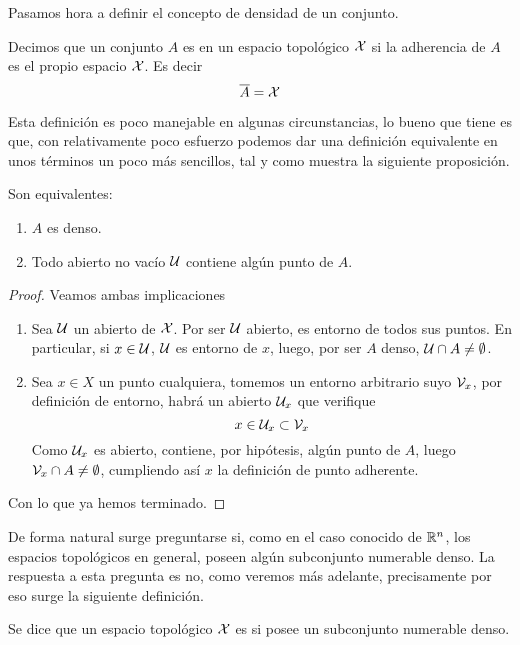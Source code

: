 Pasamos hora a definir el concepto de densidad de un conjunto.
\begin{defi}
	\label{etop_def_denso}
	Decimos que un conjunto $A$ es  en un espacio topológico $\mathcal{X}$ si la adherencia de $A$ es el propio espacio $\mathcal{X}$. Es decir
	\begin{equation*}
	\overline{A}=\mathcal{X}
	\end{equation*}
\end{defi}
Esta definición es poco manejable en algunas circunstancias, lo bueno que tiene es que, con relativamente poco esfuerzo podemos dar una definición equivalente en unos términos un poco más sencillos, tal y como muestra la siguiente proposición.
\begin{prop}
	Son equivalentes:
	\begin{enumerate}
		\item $A$ es denso.
		\item Todo abierto no vacío $\mathcal{U}$ contiene algún punto de $A$.
	\end{enumerate}
\end{prop}
\begin{proof} Veamos ambas implicaciones
	\begin{enumerate}
		\item[\bra] Sea $\mathcal{U}$ un abierto de $\mathcal{X}$. Por ser $\mathcal{U}$ abierto, es entorno de todos sus puntos. En particular, si $x\in\mathcal{U}$, $\mathcal{U}$ es entorno de $x$, luego, por ser $A$ denso, $\mathcal{U}\cap A\not= \emptyset$.
		\item[\bla] Sea $x\in X$ un punto cualquiera, tomemos un entorno arbitrario suyo $\mathcal{V}_x$, por definición de entorno, habrá un abierto $\mathcal{U}_x$ que verifique
		\begin{equation*}
		x\in\mathcal{U}_x\subset\mathcal{V}_x
		\end{equation*}
		Como $\mathcal{U}_x$ es abierto, contiene, por hipótesis, algún punto de $A$, luego $\mathcal{V}_x\cap A\not=\emptyset$, cumpliendo así $x$ la definición de punto adherente.
	\end{enumerate}
	Con lo que ya hemos terminado.
\end{proof}
De forma natural surge preguntarse si, como en el caso conocido de $\mathbb{R}^n$, los espacios topológicos en general, poseen algún subconjunto numerable denso. La respuesta a esta pregunta es no, como veremos más adelante, precisamente por eso surge la siguiente definición.
\begin{defi}
	Se dice que un espacio topológico $\mathcal{X}$ es  si posee un subconjunto numerable denso.
\end{defi}

